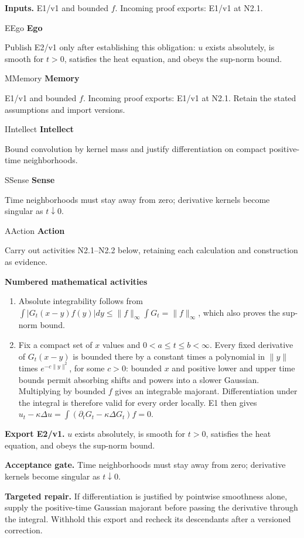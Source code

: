 \documentclass[preprint,12pt,aps,pra,showkeys,amsmath,amssymb,superscriptaddress,floatfix]{revtex4-2}
\theoremstyle{definition}
\theoremstyle{remark}
\newcommand{\mmfaculty}[3]{%
 \begin{mmfacultybox}{#1}{#2}
 {\sffamily\bfseries\color{MMBlue}#2}\par\smallskip #3
 \end{mmfacultybox}}
\newcommand{\field}[2]{\par\smallskip\noindent\textbf{#1.} #2\par}
\begin{document}
\field{Inputs}{E1/v1 and bounded \(f\). Incoming proof exports: E1/v1 at N2.1.}

\mmfaculty{E}{Ego}{Publish E2/v1 only after establishing this obligation: \(u\) exists
absolutely, is smooth for \(t>0\), satisfies the heat equation, and
obeys the sup-norm bound.}

\mmfaculty{M}{Memory}{E1/v1 and bounded \(f\). Incoming proof exports: E1/v1 at N2.1. Retain
the stated assumptions and import versions.}

\mmfaculty{I}{Intellect}{Bound convolution by kernel mass and justify differentiation on compact
positive-time neighborhoods.}

\mmfaculty{S}{Sense}{Time neighborhoods must stay away from zero; derivative kernels become
singular as \(t\downarrow0\).}

\mmfaculty{A}{Action}{Carry out activities N2.1--N2.2 below, retaining each calculation and
construction as evidence.}

\smallskip\noindent\textbf{Numbered mathematical activities}

\begin{enumerate}[label=N2.\arabic*,leftmargin=3.4em]

\item Absolute integrability follows from
\(\int|G_t(x-y)f(y)|dy\le\|f\|_\infty\int G_t=\|f\|_\infty\), which also
proves the sup-norm bound.

\item Fix a compact set of \(x\) values and \(0<a\le t\le b<\infty\). Every
fixed derivative of \(G_t(x-y)\) is bounded there by a constant times a
polynomial in \(\|y\|\) times \(e^{-c\|y\|^2}\), for some \(c>0\):
bounded \(x\) and positive lower and upper time bounds permit absorbing
shifts and powers into a slower Gaussian. Multiplying by bounded \(f\)
gives an integrable majorant. Differentiation under the integral is
therefore valid for every order locally. E1 then gives
\(u_t-\kappa\Delta u=\int(\partial_tG_t-\kappa\Delta G_t)f=0\).

\end{enumerate}

\field{Export E2/v1}{\(u\) exists absolutely, is smooth for \(t>0\), satisfies the heat
equation, and obeys the sup-norm bound.}

\field{Acceptance gate}{Time neighborhoods must stay away from zero; derivative kernels become
singular as \(t\downarrow0\).}

\field{Targeted repair}{If differentiation is justified by pointwise smoothness alone, supply
the positive-time Gaussian majorant before passing the derivative
through the integral. Withhold this export and recheck its descendants
after a versioned correction.}
\end{document}

